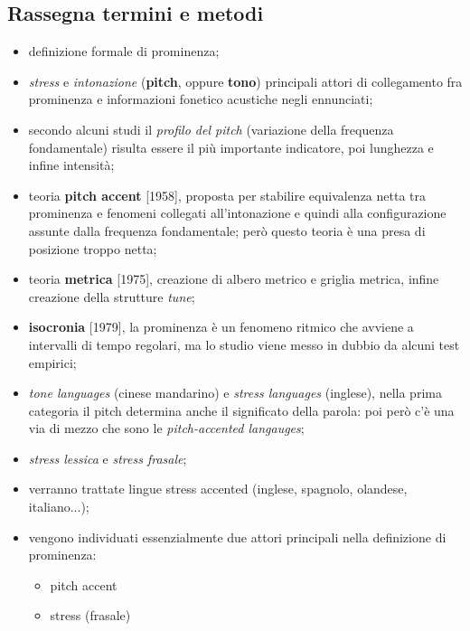 \documentclass[twoside,twocolumn,11pt]{extarticle}
\theoremstyle{definition}
\begin{document}
	\subsection{Rassegna termini e metodi}
		\begin{itemize}
			\item definizione formale di prominenza;
			\item \textit{stress} e \textit{intonazione} (\textbf{pitch}, oppure \textbf{tono}) principali attori di collegamento fra prominenza e informazioni fonetico acustiche negli ennunciati;
			\item secondo alcuni studi il \textit{profilo del pitch} (variazione della frequenza fondamentale) risulta essere il più importante indicatore, poi lunghezza e infine intensità;
			\item teoria \textbf{pitch accent} [1958], proposta per stabilire equivalenza netta tra prominenza e fenomeni collegati all'intonazione e quindi alla configurazione assunte dalla frequenza fondamentale; però questo teoria è una presa di posizione troppo netta;
			\item teoria \textbf{metrica} [1975], creazione di albero metrico e griglia metrica, infine creazione della strutture \textit{tune};
			\item \textbf{isocronia} [1979], la prominenza è un fenomeno ritmico che avviene a intervalli di tempo regolari, ma lo studio viene messo in dubbio da alcuni test empirici;
			\item \textit{tone languages} (cinese mandarino) e \textit{stress languages} (inglese), nella prima categoria il pitch determina anche il significato della parola: poi però c'è una via di mezzo che sono le \textit{pitch-accented langauges};
			\item \textit{stress lessica} e \textit{stress frasale};
			\item verranno trattate lingue stress accented (inglese, spagnolo, olandese, italiano...);
			\item vengono individuati essenzialmente due attori principali nella definizione di prominenza:
			\begin{itemize}
				\item pitch accent
				\item stress (frasale)
			\end{itemize}
		\end{itemize}
	
\end{document}
